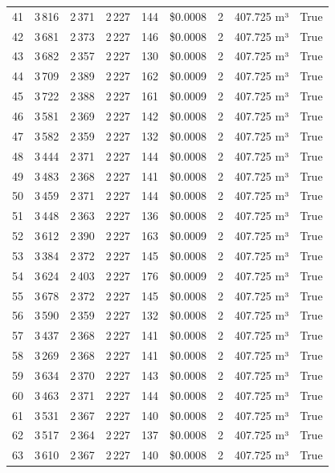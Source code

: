 \documentclass[a4paper,11pt]{article}
\begin{document}
\begin{table}[ht]
\begin{tabular}{r r r r r r r p{3cm} l}
41 & 3\,816 & 2\,371 & 2\,227 & 144 & \$0.0008 & 2 & 407.725 m³ & True \\
42 & 3\,681 & 2\,373 & 2\,227 & 146 & \$0.0008 & 2 & 407.725 m³ & True \\
43 & 3\,682 & 2\,357 & 2\,227 & 130 & \$0.0008 & 2 & 407.725 m³ & True \\
44 & 3\,709 & 2\,389 & 2\,227 & 162 & \$0.0009 & 2 & 407.725 m³ & True \\
45 & 3\,722 & 2\,388 & 2\,227 & 161 & \$0.0009 & 2 & 407.725 m³ & True \\
46 & 3\,581 & 2\,369 & 2\,227 & 142 & \$0.0008 & 2 & 407.725 m³ & True \\
47 & 3\,582 & 2\,359 & 2\,227 & 132 & \$0.0008 & 2 & 407.725 m³ & True \\
48 & 3\,444 & 2\,371 & 2\,227 & 144 & \$0.0008 & 2 & 407.725 m³ & True \\
49 & 3\,483 & 2\,368 & 2\,227 & 141 & \$0.0008 & 2 & 407.725 m³ & True \\
50 & 3\,459 & 2\,371 & 2\,227 & 144 & \$0.0008 & 2 & 407.725 m³ & True \\
51 & 3\,448 & 2\,363 & 2\,227 & 136 & \$0.0008 & 2 & 407.725 m³ & True \\
52 & 3\,612 & 2\,390 & 2\,227 & 163 & \$0.0009 & 2 & 407.725 m³ & True \\
53 & 3\,384 & 2\,372 & 2\,227 & 145 & \$0.0008 & 2 & 407.725 m³ & True \\
54 & 3\,624 & 2\,403 & 2\,227 & 176 & \$0.0009 & 2 & 407.725 m³ & True \\
55 & 3\,678 & 2\,372 & 2\,227 & 145 & \$0.0008 & 2 & 407.725 m³ & True \\
56 & 3\,590 & 2\,359 & 2\,227 & 132 & \$0.0008 & 2 & 407.725 m³ & True \\
57 & 3\,437 & 2\,368 & 2\,227 & 141 & \$0.0008 & 2 & 407.725 m³ & True \\
58 & 3\,269 & 2\,368 & 2\,227 & 141 & \$0.0008 & 2 & 407.725 m³ & True \\
59 & 3\,634 & 2\,370 & 2\,227 & 143 & \$0.0008 & 2 & 407.725 m³ & True \\
60 & 3\,463 & 2\,371 & 2\,227 & 144 & \$0.0008 & 2 & 407.725 m³ & True \\
61 & 3\,531 & 2\,367 & 2\,227 & 140 & \$0.0008 & 2 & 407.725 m³ & True \\
62 & 3\,517 & 2\,364 & 2\,227 & 137 & \$0.0008 & 2 & 407.725 m³ & True \\
63 & 3\,610 & 2\,367 & 2\,227 & 140 & \$0.0008 & 2 & 407.725 m³ & True \\

\end{tabular}
\end{table}
\end{document}
